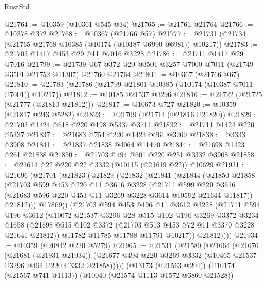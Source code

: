 \begin{lexlean}{RustStd}
\begin{coremodule}
@21764 := @10359 (@10361 @545 @34)
@21765 := @21761 @21764
@21766 := @10378 @372
@21768 := @10367 (@21766 @57)
@21777 := @21731 (@21734 (@21765 @21768 @10385 (@10174 (@10387 @6990 @6981)) @10217))
@21783 := @21703 @1417 @453 @29 @11 @7016 @3228
@21786 := @21711 @1417 @29 @7016
@21799 := @21739 @67 @372 @29 @3501 @3257 @7000 @7011 (@21749 @3501 @21752 @11307) @21760 @21764
@21801 := @10367 (@21766 @67)
@21810 := @21783 (@21786 (@21799 @21801 @10385 (@10174 (@10387 @7011 @7001)) @10217))
@21812 := @10185 @21537 @3296
@21816 := @21722 (@21725 (@21777 (@21810 @21812)))
@21817 := @10673 @727
@21820 := @10359 (@21817 @243 @5282)
@21823 := @21709 (@21714 (@21816 @21820))
@21829 := @21703 @1424 @618 @220 @198 @5337 @3711
@21832 := @21711 @1424 @220 @5337
@21837 := @21683 @754 @220 @1423 @261 @3269
@21838 := @3333 @3908
@21841 := @21837 @21838 @4064 @11470
@21844 := @21698 @1423 @261 @21838
@21850 := @21703 @494 @601 @220 @251 @3332 @3908
@21858 := @21614 @22 @220 @22 @3332 (@10115 (@21619 @22)) @10629
@21931 := @21696
    (@21701
      (@21823
        (@21829
          (@21832
            (@21841
              (@21844
                (@21850
                  @21858
                  (@21703
                    @599
                    @453
                    @220
                    @11
                    @3616
                    @3228
                    (@21711
                      @599
                      @220
                      @3616
                      (@21683 @596 @220 @453 @11 @3269 @3228 @3614 @10592 @21644 @11817))
                    @21812)))
              @17869))
          (@21703
            @594
            @453
            @196
            @11
            @3612
            @3228
            (@21711
              @594
              @196
              @3612
              (@10072
                @21537
                @3296
                @28
                @515
                @102
                @196
                @3269
                @3372
                @3234
                @1658
                (@21698 @515 @102 @3372 (@21703 @513 @453 @72 @11 @3370 @3228 @21641 @21812))
                @11782
                @11785
                @11788
                @11791
                @10217))
            @21812))))
@21934 := @10359 (@20842 @220 @5279)
@21965 := @21531
    (@21580
      (@21664
        (@21676
          (@21681 (@21931 @21934))
          (@21677 @494 @220 @3269 @3332 (@10465 @21537 @3296 @494 @220 @3332 @21858)))))
    (@13173 (@21563 @204))
    (@10174 (@21567 @741 @1113))
    (@10040 (@21574 @1113 @1572 @6860 @21528))

\end{coremodule}
\end{lexlean}
